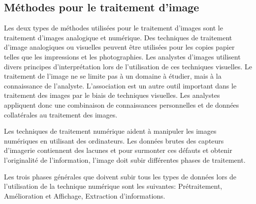 \documentclass[12pt]{article}
\begin{document}
\subsection{Méthodes pour le traitement d’image}
Les deux types de méthodes utilisées pour le traitement d'images sont le traitement d'images analogique et numérique. Des techniques de traitement d'image analogiques ou visuelles peuvent être utilisées pour les copies papier telles que les impressions et les photographies. Les analystes d'images utilisent divers principes d'interprétation lors de l'utilisation de ces techniques visuelles. Le traitement de l'image ne se limite pas à un domaine à étudier, mais à la connaissance de l'analyste. L'association est un autre outil important dans le traitement des images par le biais de techniques visuelles. Les analystes appliquent donc une combinaison de connaissances personnelles et de données collatérales au traitement des images.

Les techniques de traitement numérique aident à manipuler les images numériques en utilisant des ordinateurs. Les données brutes des capteurs d'imagerie contiennent des lacunes et pour surmonter ces défauts et obtenir l’originalité de l’information, l’image doit subir différentes phases de traitement.

Les trois phases générales que doivent subir tous les types de données lors de l’utilisation de la technique numérique sont les suivantes: Prétraitement, Amélioration et Affichage, Extraction d’informations.
\end{document}
